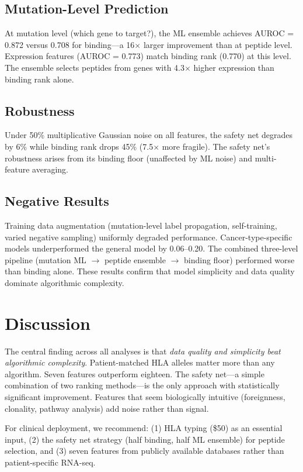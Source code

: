 \documentclass[11pt,twocolumn]{article}
\begin{document}
\subsection{Mutation-Level Prediction}

At mutation level (which gene to target?), the ML ensemble achieves AUROC = 0.872 versus 0.708 for binding---a 16$\times$ larger improvement than at peptide level. Expression features (AUROC = 0.773) match binding rank (0.770) at this level. The ensemble selects peptides from genes with 4.3$\times$ higher expression than binding rank alone.

\subsection{Robustness}

Under 50\% multiplicative Gaussian noise on all features, the safety net degrades by 6\% while binding rank drops 45\% (7.5$\times$ more fragile). The safety net's robustness arises from its binding floor (unaffected by ML noise) and multi-feature averaging.

\subsection{Negative Results}

Training data augmentation (mutation-level label propagation, self-training, varied negative sampling) uniformly degraded performance. Cancer-type-specific models underperformed the general model by 0.06--0.20. The combined three-level pipeline (mutation ML $\to$ peptide ensemble $\to$ binding floor) performed worse than binding alone. These results confirm that model simplicity and data quality dominate algorithmic complexity.

\section{Discussion}

The central finding across all analyses is that \textit{data quality and simplicity beat algorithmic complexity}. Patient-matched HLA alleles matter more than any algorithm. Seven features outperform eighteen. The safety net---a simple combination of two ranking methods---is the only approach with statistically significant improvement. Features that seem biologically intuitive (foreignness, clonality, pathway analysis) add noise rather than signal.

For clinical deployment, we recommend: (1) HLA typing (\$50) as an essential input, (2) the safety net strategy (half binding, half ML ensemble) for peptide selection, and (3) seven features from publicly available databases rather than patient-specific RNA-seq.
\end{document}
